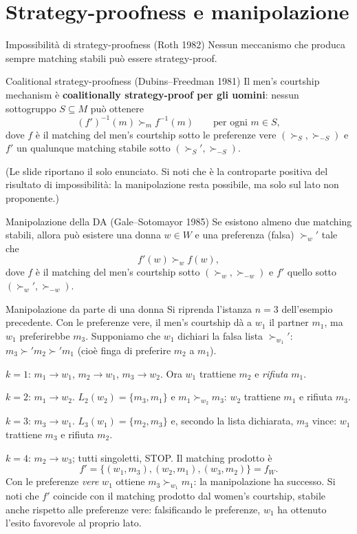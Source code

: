 \documentclass[12pt,a4paper,twoside]{book}
\theoremstyle{plain}
\theoremstyle{definition}
\begin{document}
\section{Strategy-proofness e manipolazione}

\begin{thmbox}{Impossibilità di strategy-proofness (Roth 1982)}
Nessun meccanismo che produca sempre matching stabili può essere strategy-proof.
\end{thmbox}

\begin{thmbox}{Coalitional strategy-proofness (Dubins--Freedman 1981)}
Il men's courtship mechanism è \textbf{coalitionally strategy-proof per gli uomini}: nessun sottogruppo $S\subseteq M$ può ottenere
\[ (f')^{-1}(m)\succ_m f^{-1}(m)\qquad\text{per ogni } m\in S, \]
dove $f$ è il matching del men's courtship sotto le preferenze vere $(\succ_S,\succ_{-S})$ e $f'$ un qualunque matching stabile sotto $(\succ_S',\succ_{-S})$.
\end{thmbox}

(Le slide riportano il solo enunciato. Si noti che è la controparte positiva del risultato di impossibilità: la manipolazione resta possibile, ma solo sul lato non proponente.)

\begin{thmbox}{Manipolazione della DA (Gale--Sotomayor 1985)}
Se esistono almeno due matching stabili, allora può esistere una donna $w\in W$ e una preferenza (falsa) $\succ_w'$ tale che
\[ f'(w)\succ_w f(w), \]
dove $f$ è il matching del men's courtship sotto $(\succ_w,\succ_{-w})$ e $f'$ quello sotto $(\succ_w',\succ_{-w})$.
\end{thmbox}

\begin{exbox}{Manipolazione da parte di una donna}
Si riprenda l'istanza $n=3$ dell'esempio precedente. Con le preferenze vere, il men's courtship dà a $w_1$ il partner $m_1$, ma $w_1$ preferirebbe $m_3$. Supponiamo che $w_1$ dichiari la falsa lista $\succ_{w_1}'$: $m_3\succ' m_2\succ' m_1$ (cioè finga di preferire $m_2$ a $m_1$).

$k=1$: $m_1\to w_1$, $m_2\to w_1$, $m_3\to w_2$. Ora $w_1$ trattiene $m_2$ e \emph{rifiuta} $m_1$.

$k=2$: $m_1\to w_2$. $L_2(w_2)=\{m_3,m_1\}$ e $m_1\succ_{w_2}m_3$: $w_2$ trattiene $m_1$ e rifiuta $m_3$.

$k=3$: $m_3\to w_1$. $L_3(w_1)=\{m_2,m_3\}$ e, secondo la lista dichiarata, $m_3$ vince: $w_1$ trattiene $m_3$ e rifiuta $m_2$.

$k=4$: $m_2\to w_3$; tutti singoletti, STOP. Il matching prodotto è
\[ f'=\{(w_1,m_3),(w_2,m_1),(w_3,m_2)\}=f_W. \]
Con le preferenze \emph{vere} $w_1$ ottiene $m_3\succ_{w_1}m_1$: la manipolazione ha successo. Si noti che $f'$ coincide con il matching prodotto dal women's courtship, stabile anche rispetto alle preferenze vere: falsificando le preferenze, $w_1$ ha ottenuto l'esito favorevole al proprio lato.
\end{exbox}
\end{document}
